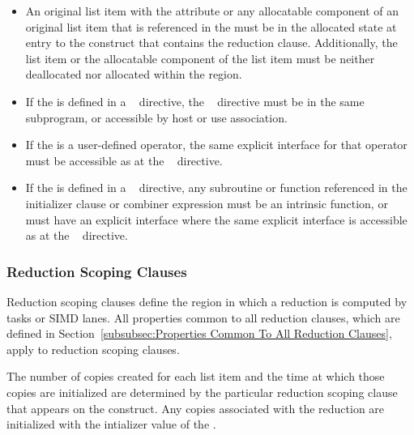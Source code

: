 {{{{\begin{itemize}
\item An original list item with the  attribute or any
allocatable component of an original list item that is referenced in the
 must be in the allocated state at entry to the construct that
contains the reduction clause. Additionally, the list item or the allocatable
component of the list item must be neither deallocated nor allocated within the
region.

\item If the  is defined in a ~
directive, the ~ directive must be in the same
subprogram, or accessible by host or use association.

\item If the  is a user-defined operator, the same
explicit interface for that operator must be accessible as at the
~ directive.

\item If the  is defined in a ~
directive, any subroutine or function referenced in the initializer clause or
combiner expression must be an intrinsic function, or must have an explicit
interface where the same explicit interface is accessible as at the
~ directive.
\fortranspecificend
\end{itemize}










\subsubsection{Reduction Scoping Clauses}
\label{subsubsec:Reduction Scoping Clauses}
Reduction scoping clauses define the region in which a reduction is computed by
tasks or SIMD lanes. All properties common to all reduction clauses,
which are defined in Section~\ref{subsubsec:Properties Common To All Reduction
Clauses}, apply to reduction scoping clauses.

The number of copies created for each list item and the time at which those
copies are initialized are determined by the particular reduction scoping clause
that appears on the construct. Any copies associated with the reduction are
initialized with the intializer value of the .


}}}}
